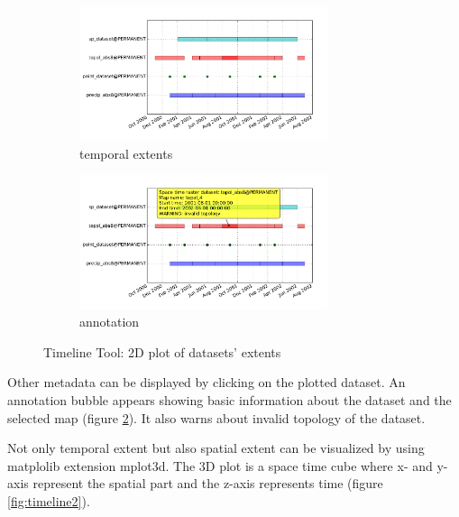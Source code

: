 \documentclass[a4paper,12pt]{book}
\begin{document}
\begin{figure}[ht!]
  \centering
  \begin{subfigure}[ht]{\textwidth}
  \centering
  \includegraphics[width=0.8\textwidth]{./images/timeline1.pdf}
  \caption{temporal extents}
  \label{fig:timeline1}
  \end{subfigure}

  \begin{subfigure}[ht]{\textwidth}
  \centering
  \includegraphics[width=0.8\textwidth]{./images/timeline3.pdf}
  \caption{annotation}
  \label{fig:timeline3}
  \end{subfigure}
%   
\caption{Timeline Tool: 2D plot of datasets' extents}
\label{fig:timeline}
\end{figure}

Other metadata can be displayed by clicking on the plotted dataset.
An annotation bubble appears showing basic information about the dataset and the selected map (figure \ref{fig:timeline3}).
It also warns about invalid topology of the dataset.


Not only temporal extent but also spatial extent can be visualized by using matplolib extension mplot3d.
The 3D plot is a space time cube where x- and y-axis represent the spatial part and the z-axis represents time (figure \ref{fig:timeline2}).
\end{document}
